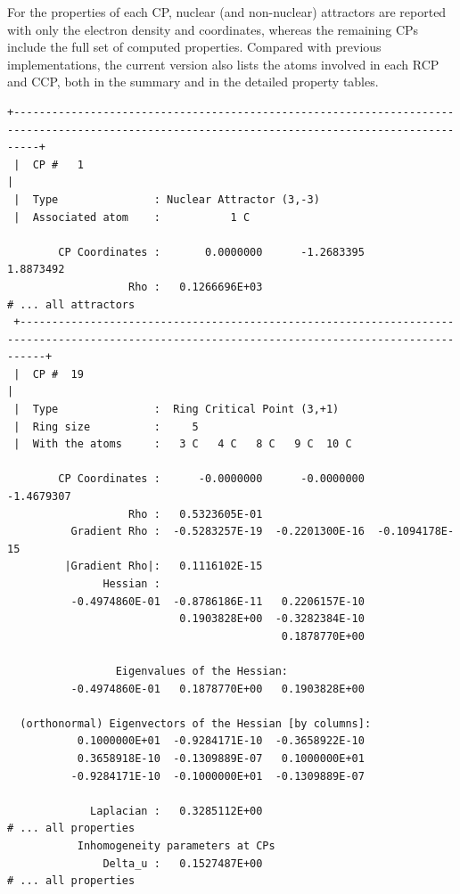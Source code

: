 \newpage

For the properties of each \gls{CP}, nuclear (and non-nuclear) attractors are
reported with only the electron density and coordinates, whereas the remaining
\glspl{CP} include the full set of computed properties. Compared with previous
implementations, the current version also lists the atoms involved in each
\gls{RCP} and \gls{CCP}, both in the summary and in the detailed property
tables.

\begin{lstlisting}[language=plain]
 +------------------------------------------------------------------------------------------------------------------------------------------------+
 |  CP #   1                                                              |
 |  Type               : Nuclear Attractor (3,-3)
 |  Associated atom    :           1 C
 
        CP Coordinates :       0.0000000      -1.2683395       1.8873492
                   Rho :   0.1266696E+03
# ... all attractors
 +------------------------------------------------------------------------------------------------------------------------------------------------+
 |  CP #  19                                                              |
 |  Type               :  Ring Critical Point (3,+1) 
 |  Ring size          :     5
 |  With the atoms     :   3 C   4 C   8 C   9 C  10 C

        CP Coordinates :      -0.0000000      -0.0000000      -1.4679307
                   Rho :   0.5323605E-01
          Gradient Rho :  -0.5283257E-19  -0.2201300E-16  -0.1094178E-15
         |Gradient Rho|:   0.1116102E-15
               Hessian :
          -0.4974860E-01  -0.8786186E-11   0.2206157E-10
                           0.1903828E+00  -0.3282384E-10
                                           0.1878770E+00
 
                 Eigenvalues of the Hessian:
          -0.4974860E-01   0.1878770E+00   0.1903828E+00
 
  (orthonormal) Eigenvectors of the Hessian [by columns]:
           0.1000000E+01  -0.9284171E-10  -0.3658922E-10
           0.3658918E-10  -0.1309889E-07   0.1000000E+01
          -0.9284171E-10  -0.1000000E+01  -0.1309889E-07
 
             Laplacian :   0.3285112E+00
# ... all properties 
           Inhomogeneity parameters at CPs
               Delta_u :   0.1527487E+00
# ... all properties 
\end{lstlisting}

